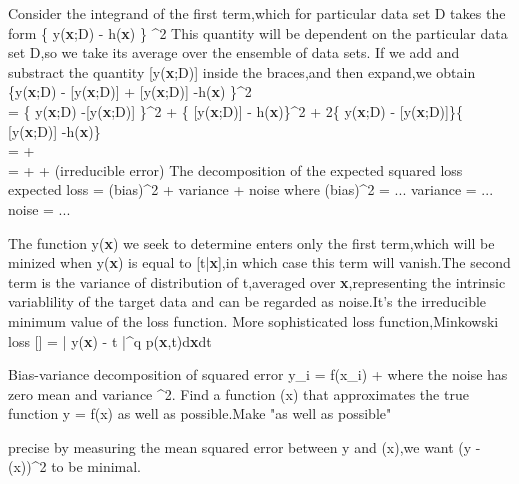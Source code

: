 Consider the integrand of the first term,which for particular data set D takes the form
  \{ y(\textbf{x};D) - h(\textbf{x}) \} ^2
This quantity will be dependent on the particular data set D,so we take its average over the ensemble of data sets.
If we add and substract the quantity [y(\textbf{x};D)] inside the braces,and then expand,we obtain
\{y(\textbf{x};D) - [y(\textbf{x};D)] + [y(\textbf{x};D)] -h(\textbf{x})  \}^2         \\
= \{ y(\textbf{x};D) -[y(\textbf{x};D)]    \}^2 + \{ [y(\textbf{x};D)] - h(\textbf{x})\}^2 +
  2\{ y(\textbf{x};D) - [y(\textbf{x};D)]\}\{ [y(\textbf{x};D)] -h(\textbf{x})\} \\
=  +    \\
=                    \color{red}{variance}                 +   \color{blue}{(bias)^2}  + (irreducible error)
The decomposition of the expected squared loss
                                  expected loss = (bias)^2 + variance + noise
where
                                  (bias)^2 = ...
                                  variance = ...
                                  noise = ...
  
The function y(\textbf{x}) we seek to determine enters only the first term,which will be minized when y(\textbf{x}) 
is equal to [t|\textbf{x}],in which case this term will vanish.The second term is the variance of 
distribution of t,averaged over \textbf{x},representing the intrinsic variablility of the target data and can be 
regarded as noise.It's the irreducible minimum value of the loss function.
More sophisticated loss function,Minkowski loss
[] = \int\int| y(\textbf{x}) - t |^q p(\textbf{x},t)d\textbf{x}dt




Bias-variance decomposition of squared error
                                  y_i = f(x_i) + \epsilon 
where the noise \epsilon has zero mean and variance \sigma^2.
Find a function (x) that approximates the true function y = f(x) as well as possible.Make "as well as possible"

precise  by measuring the mean squared error between y and (x),we want (y - (x))^2 to be minimal.










